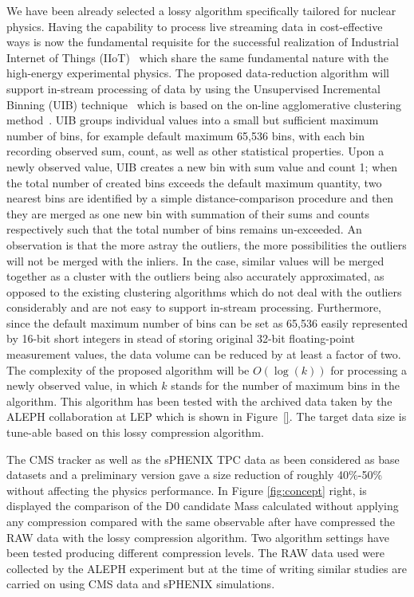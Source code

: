 We have been already selected a lossy algorithm specifically tailored for nuclear physics. Having the capability to process live streaming data in cost-effective ways is now the fundamental requisite for the successful realization of Industrial Internet of Things (IIoT)~\cite{} which share the same fundamental nature with the high-energy experimental physics. The proposed data-reduction algorithm will support in-stream processing of data by using the Unsupervised Incremental Binning (UIB) technique~\cite{} which is based on the on-line agglomerative clustering method~\cite{}. UIB groups individual values into a small but sufficient maximum number of bins, for example default maximum 65,536 bins, with each bin recording observed sum, count, as well as other statistical properties. Upon a newly observed value, UIB creates a new bin with sum value and count 1; when the total number of created bins exceeds the default maximum quantity, two nearest bins are identified by a simple distance-comparison procedure and then they are merged as one new bin with summation of their sums and counts respectively such that the total number of bins remains un-exceeded. An observation is that the more astray the outliers, the more possibilities the outliers will not be merged with the inliers. In the case, similar values will be merged together as a cluster with the outliers being also accurately approximated, as opposed to the existing clustering algorithms which do not deal with the outliers considerably and are not easy to support in-stream processing. Furthermore, since the default maximum number of bins can be set as 65,536 easily represented by 16-bit short integers in stead of storing original 32-bit floating-point measurement values, the data volume can be reduced by at least a factor of two.  The complexity of the proposed algorithm will be $O(\log(k))$ for processing a newly observed value, in which $k$ stands for the number of maximum bins in the algorithm. This algorithm has been tested with the archived data taken by the ALEPH collaboration at LEP which is shown in Figure~\ref{}. The target data size is tune-able based on this lossy compression algorithm. 


The CMS tracker as well as the sPHENIX TPC data as been considered as base datasets and a preliminary version gave a size reduction of roughly 40\%-50\% without affecting the physics performance. In Figure \ref{fig:concept} right, is displayed the comparison of the D0 candidate Mass calculated without applying any compression compared with the same observable after have compressed the RAW data with the lossy compression algorithm. Two algorithm settings have been tested producing different compression levels. The RAW data used were collected by the ALEPH experiment but at the time of writing similar studies are carried on using CMS data and sPHENIX simulations. 



